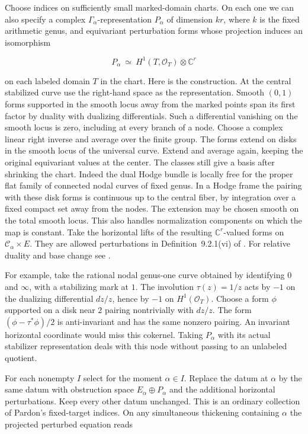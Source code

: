 Choose indices on sufficiently small marked-domain charts. On each
one we can also specify a complex $\Gamma_\alpha$-representation
$P_\alpha$ of dimension $kr$, where $k$ is the fixed arithmetic
genus, and equivariant perturbation forms whose projection induces
an isomorphism

\[
           P_\alpha \ \simeq\
             H^1(T,\mathcal O_T)\otimes\mathbb C^r
\]

on each labeled domain $T$ in the chart. Here is the construction.
At the central stabilized curve use the right-hand space as the
representation. Smooth $(0,1)$ forms supported in the smooth locus
away from the marked points span its first factor by duality with
dualizing differentials. Such a differential vanishing on the smooth
locus is zero, including at every branch of a node. Choose a complex
linear right inverse and average over the finite group. The forms
extend on disks in the smooth locus of the universal curve. Extend
and average again, keeping the original equivariant values at the
center. The classes still give a basis after shrinking the chart.
Indeed the dual Hodge bundle is locally free for the proper flat
family of connected nodal curves of fixed genus. In a Hodge frame
the pairing with these disk forms is continuous up to the central
fiber, by integration over a fixed compact set away from the nodes.
The extension may be chosen smooth on the total smooth locus.
This also handles normalization components on which the map is
constant. Take the horizontal lifts of the resulting
$\mathbb C^r$-valued forms on $\mathcal C_\alpha\times E$. They
are allowed perturbations in Definition~9.2.1(vi) of \cite{Atlas}. For relative duality and base change see \cite[Tags 0E6N and 0E6S]{Stacks}.

For example, take the rational nodal genus-one curve obtained by
identifying $0$ and $\infty$, with a stabilizing mark at $1$. The
involution $\tau(z)=1/z$ acts by $-1$ on the dualizing differential
$dz/z$, hence by $-1$ on $H^1(\mathcal O_T)$. Choose a form
$\phi$ supported on a disk near $2$ pairing nontrivially with
$dz/z$. The form $(\phi-\tau^*\phi)/2$ is anti-invariant and has
the same nonzero pairing. An invariant horizontal coordinate
would miss this cokernel. Taking $P_\alpha$ with its actual
stabilizer representation deals with this node without passing to
an unlabeled quotient.

For each nonempty $I$ select for the moment $\alpha\in I$. Replace
the datum at $\alpha$ by the same datum with obstruction space
$E_\alpha\oplus P_\alpha$ and the additional horizontal perturbations.
Keep every other datum unchanged. This is an ordinary collection
of Pardon's fixed-target indices. On any simultaneous thickening
containing $\alpha$ the projected perturbed equation reads

